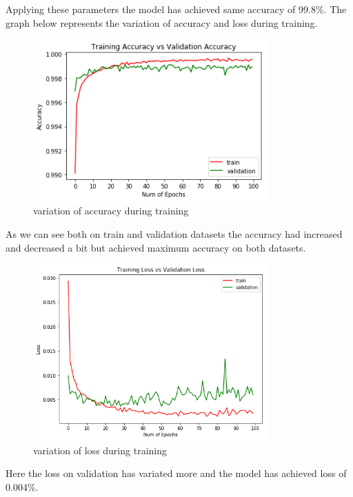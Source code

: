  \noindent Applying these parameters the model has achieved same accuracy of 99.8\%. The graph below represents the variation of accuracy and loss during training.
 \begin{figure}[h!]
    \centering
    \includegraphics[width=0.8\textwidth]{thesis_template/images/100train.png}
    \caption{\small variation of accuracy during training}
    \label{}
    \end{figure}
\noindent As we can see both on train and validation datasets the accuracy had increased and decreased a bit but achieved maximum accuracy on both datasets.

 \begin{figure}[h!]
    \centering
    \includegraphics[width=0.8\textwidth]{thesis_template/images/100loss.png}
    \caption{\small variation of loss during training}
    \label{}
    \end{figure}
\newpage\noindent Here the loss on validation has variated more and the model has achieved loss of 0.004\%.

